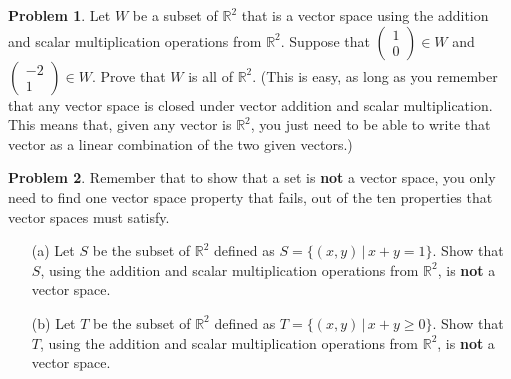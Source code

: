 \documentclass[12pt]{article}
\newcommand{\R}{{\mathbb R}}
\theoremstyle{definition}
\newtheorem{problem}{Problem}
\newenvironment{answer}{\par\bigskip\bgroup\color{darkblue}}{\egroup}
\begin{document}
\begin{answer}
\end{answer}



\begin{problem} 
Let $W$ be a subset of $\R^2$ that is a vector space using the addition and scalar multiplication operations from $\R^2$.
Suppose that $\begin{pmatrix} 1\\ 0 \end{pmatrix}\in W$ and $\begin{pmatrix} -2\\ 1\end{pmatrix}\in W$.  
Prove that $W$ is all of $\R^2$.  (This is easy, as long as you remember that any vector space is closed under 
vector addition and scalar multiplication.  This means that, given any vector is $\R^2$, you just need to be
able to write that vector as a linear combination of the two given vectors.)
\end{problem}


\begin{answer}
\end{answer}



\begin{problem}
Remember that to show that a set is \textbf{not} a vector space, you only need to find one vector space property that fails,
out of the ten properties that vector spaces must satisfy.
\begin{enumerate}
\item[(a)] Let $S$ be the subset of $\R^2$ defined as $S=\{(x,y)\,|\,x+y=1\}$. Show that $S$, using
the addition and scalar multiplication operations from $\R^2$, is \textbf{not} a vector space.  
\item[(b)] Let $T$ be the subset of $\R^2$ defined as $T=\{(x,y)\,|\,x+y\ge 0\}$. Show that $T$, using
the addition and scalar multiplication operations from $\R^2$, is \textbf{not} a vector space.
\end{enumerate}
\end{problem}


\begin{answer}
\end{answer}
\end{document}
